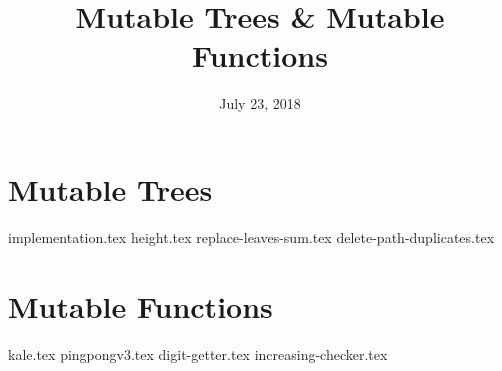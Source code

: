 \documentclass{exam}
\title{Mutable Trees \& Mutable Functions}
\date{July 23, 2018}
\begin{document}
\maketitle

\begin{questions}
\section{Mutable Trees}
{implementation.tex}
\newpage
{height.tex}
{replace-leaves-sum.tex}
{delete-path-duplicates.tex}
\section{Mutable Functions}
{kale.tex}
{pingpongv3.tex}
{digit-getter.tex}
{increasing-checker.tex}
\end{questions}
\end{document}
